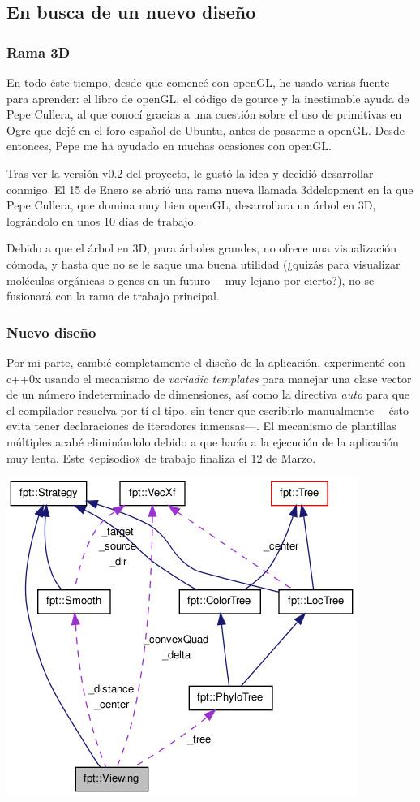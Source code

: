 \subsection{En busca de un nuevo diseño}
\subsubsection{Rama 3D}
En todo éste tiempo, desde que comencé con openGL, he usado varias
fuente para aprender: el libro de openGL, el código de gource y la
inestimable ayuda de Pepe Cullera, al que conocí gracias a una
cuestión sobre el uso de primitivas en Ogre que dejé en el foro
español de Ubuntu, antes de pasarme a openGL. Desde entonces, Pepe me
ha ayudado en muchas ocasiones con openGL.

Tras ver la versión v0.2 del proyecto, le gustó la idea y decidió
desarrollar conmigo. El 15 de Enero se abrió una rama nueva llamada
3ddelopment en la que Pepe Cullera, que domina muy bien openGL,
desarrollara un árbol en 3D, lográndolo en unos 10 días de trabajo.

Debido a que el árbol en 3D, para árboles grandes, no ofrece una
visualización cómoda, y hasta que no se le saque una buena utilidad
(¿quizás para visualizar moléculas orgánicas o genes en un futuro \----muy
lejano por cierto?), no se fusionará con la rama de trabajo
principal.

\subsubsection{Nuevo diseño}
Por mi parte, cambié completamente el diseño de la aplicación,
experimenté con c++0x usando el mecanismo de \textit{variadic
  templates} para manejar una clase vector de un número indeterminado
de dimensiones, así como la directiva \textit{auto} para que el
compilador resuelva por tí el tipo, sin tener que escribirlo
manualmente \----ésto evita tener declaraciones de iteradores
inmensas\----. El mecanismo de plantillas múltiples acabé eliminándolo
debido a que hacía a la ejecución de la aplicación muy lenta. Este
«episodio» de trabajo finaliza el 12 de Marzo.

\begin{center}
\includegraphics[scale=.65]{images/classDiagram.png}
\end{center}

